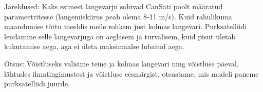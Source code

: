 Järeldused:
Kaks esimest langevarju sobivad CanSati poolt määratud parameetritesse (langemiskiirus peab olema 8-11 m/s).
Kuid rahulikuma maandumise tõttu meeldis meile rohkem just kolmas langevari. Purksatelliidi lendamine selle langevarjuga on aeglasem ja turvalisem, kuid pisut ületab kukutamise aega, aga ei ületa maksimaalse lubatud aega.

Otsus:
Võistluseks valisime teine ja kolmas langevari ning võistluse päeval, lähtudes ilmatingimustest ja võistluse eesmärgist, otsustame, mis mudeli paneme purksatelliidi juurde.

